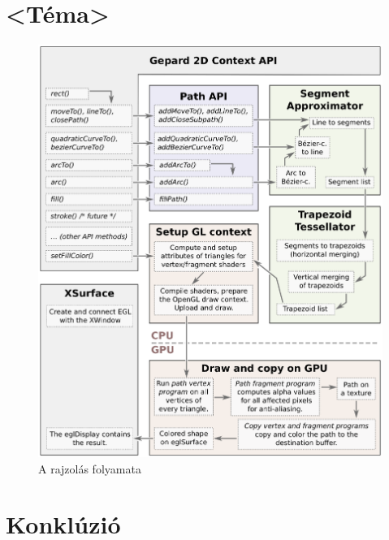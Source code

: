 \documentclass[12pt]{report}
\theoremstyle{definition}
\begin{document}

    \chapter{<Téma>\cite{Cabanier:14:HCC}}

    \begin{figure}[h]
    \centering
    \centerline{\includegraphics[scale=0.6]{eps/dataflow_svg}}
    \caption{\label{dataflow-diagram} A rajzolás folyamata}
    \end{figure}



    \chapter{Konklúzió}
\end{document}
